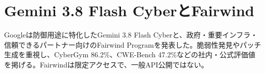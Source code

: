 \section{Gemini 3.8 Flash CyberとFairwind}
Googleは防御用途に特化したGemini 3.8 Flash Cyberと、政府・重要インフラ・信頼できるパートナー向けのFairwind Programを発表した。脆弱性発見やパッチ生成を重視し、CyberGym 86.2\%、CWE-Bench 47.2\%などの社内・公式評価値を掲げる。Fairwindは限定アクセスで、一般API公開ではない。
